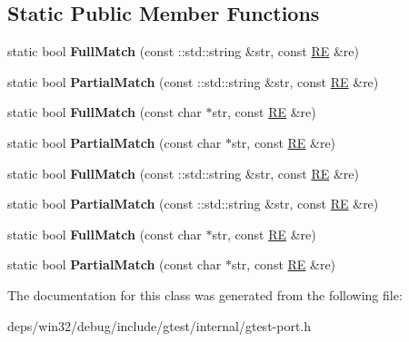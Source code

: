 \subsection*{Static Public Member Functions}
\begin{DoxyCompactItemize}
\item 
\hypertarget{classtesting_1_1internal_1_1_r_e_aa79a950758d0f1d62f7762d1e9cefe86}{}static bool {\bfseries Full\+Match} (const \+::std\+::string \&str, const \hyperlink{classtesting_1_1internal_1_1_r_e}{R\+E} \&re)\label{classtesting_1_1internal_1_1_r_e_aa79a950758d0f1d62f7762d1e9cefe86}

\item 
\hypertarget{classtesting_1_1internal_1_1_r_e_a1e81f9a87211bdca645e025f8f0236c8}{}static bool {\bfseries Partial\+Match} (const \+::std\+::string \&str, const \hyperlink{classtesting_1_1internal_1_1_r_e}{R\+E} \&re)\label{classtesting_1_1internal_1_1_r_e_a1e81f9a87211bdca645e025f8f0236c8}

\item 
\hypertarget{classtesting_1_1internal_1_1_r_e_a2b13ec1f6ccd6c32f7efa01e21588f0b}{}static bool {\bfseries Full\+Match} (const char $\ast$str, const \hyperlink{classtesting_1_1internal_1_1_r_e}{R\+E} \&re)\label{classtesting_1_1internal_1_1_r_e_a2b13ec1f6ccd6c32f7efa01e21588f0b}

\item 
\hypertarget{classtesting_1_1internal_1_1_r_e_a97495dd4c2bb9589522823f060c8e8ba}{}static bool {\bfseries Partial\+Match} (const char $\ast$str, const \hyperlink{classtesting_1_1internal_1_1_r_e}{R\+E} \&re)\label{classtesting_1_1internal_1_1_r_e_a97495dd4c2bb9589522823f060c8e8ba}

\item 
\hypertarget{classtesting_1_1internal_1_1_r_e_aa79a950758d0f1d62f7762d1e9cefe86}{}static bool {\bfseries Full\+Match} (const \+::std\+::string \&str, const \hyperlink{classtesting_1_1internal_1_1_r_e}{R\+E} \&re)\label{classtesting_1_1internal_1_1_r_e_aa79a950758d0f1d62f7762d1e9cefe86}

\item 
\hypertarget{classtesting_1_1internal_1_1_r_e_a1e81f9a87211bdca645e025f8f0236c8}{}static bool {\bfseries Partial\+Match} (const \+::std\+::string \&str, const \hyperlink{classtesting_1_1internal_1_1_r_e}{R\+E} \&re)\label{classtesting_1_1internal_1_1_r_e_a1e81f9a87211bdca645e025f8f0236c8}

\item 
\hypertarget{classtesting_1_1internal_1_1_r_e_a2b13ec1f6ccd6c32f7efa01e21588f0b}{}static bool {\bfseries Full\+Match} (const char $\ast$str, const \hyperlink{classtesting_1_1internal_1_1_r_e}{R\+E} \&re)\label{classtesting_1_1internal_1_1_r_e_a2b13ec1f6ccd6c32f7efa01e21588f0b}

\item 
\hypertarget{classtesting_1_1internal_1_1_r_e_a97495dd4c2bb9589522823f060c8e8ba}{}static bool {\bfseries Partial\+Match} (const char $\ast$str, const \hyperlink{classtesting_1_1internal_1_1_r_e}{R\+E} \&re)\label{classtesting_1_1internal_1_1_r_e_a97495dd4c2bb9589522823f060c8e8ba}

\end{DoxyCompactItemize}


The documentation for this class was generated from the following file\+:\begin{DoxyCompactItemize}
\item 
deps/win32/debug/include/gtest/internal/gtest-\/port.\+h\end{DoxyCompactItemize}
